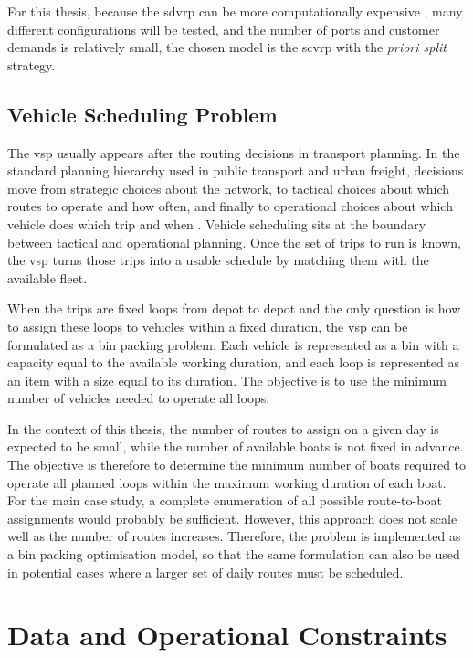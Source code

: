 \documentclass[12pt]{article}
\begin{document}
For this thesis, because the \ac{sdvrp} can be more computationally expensive \parencite{a17090396}, many different configurations will be tested, and the number of ports and customer demands is relatively small, the chosen model is the \ac{scvrp} with the \textit{priori split} strategy.

\subsection{Vehicle Scheduling Problem}
\label{subsec:vehicle-scheduling-problem}

The \ac{vsp} usually appears after the routing decisions in transport planning. In the standard planning hierarchy used in public transport and urban freight, decisions move from strategic choices about the network, to tactical choices about which routes to operate and how often, and finally to operational choices about which vehicle does which trip and when \parencite{ibarra2015planning}. Vehicle scheduling sits at the boundary between tactical and operational planning. Once the set of trips to run is known, the \ac{vsp} turns those trips into a usable schedule by matching them with the available fleet.

When the trips are fixed loops from depot to depot and the only question is how to assign these loops to vehicles within a fixed duration, the \ac{vsp} can be formulated as a bin packing problem. Each vehicle is represented as a bin with a capacity equal to the available working duration, and each loop is represented as an item with a size equal to its duration. The objective is to use the minimum number of vehicles needed to operate all loops.

In the context of this thesis, the number of routes to assign on a given day is expected to be small, while the number of available boats is not fixed in advance. The objective is therefore to determine the minimum number of boats required to operate all planned loops within the maximum working duration of each boat. For the main case study, a complete enumeration of all possible route-to-boat assignments would probably be sufficient. However, this approach does not scale well as the number of routes increases. Therefore, the problem is implemented as a bin packing optimisation model, so that the same formulation can also be used in potential cases where a larger set of daily routes must be scheduled.

\section{Data and Operational Constraints}
\label{sec:data}
\end{document}
